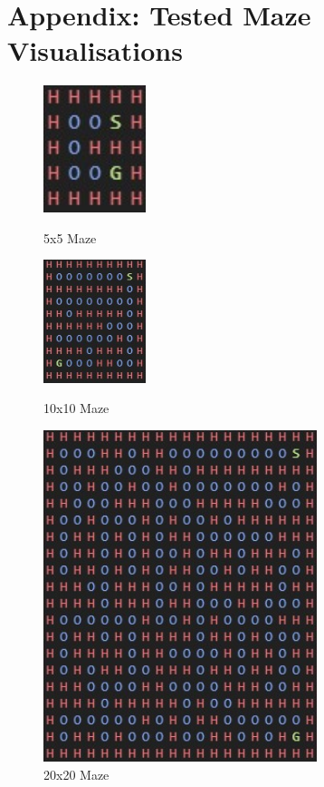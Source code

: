 \documentclass[twoside, 12pt, a4paper]{article}
\begin{document}



\newpage
\appendix
\section{Appendix: Tested Maze Visualisations} \label{appendix:a}

\begin{figure}[ht]
\begin{center}
\includegraphics[width=3cm]{5x5.jpg} 
\caption{\label{tab:table-name}5x5 Maze}

\includegraphics[width=3cm]{10x10.jpg} 
\caption{\label{tab:table-name}10x10 Maze}

\includegraphics[width=8cm]{20x20.jpg} 
\caption{\label{tab:table-name}20x20 Maze}
\end {center}
\end{figure}
\end{document}
